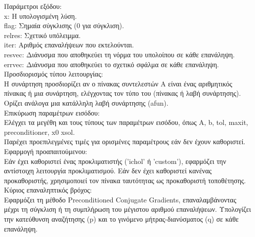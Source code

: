 \documentclass[12pt,a4paper]{article}
\begin{document}
Παράμετροι εξόδου:\\
x: Η υπολογισμένη λύση.\\
flag: Σημαία σύγκλισης (0 για σύγκλιση).\\
relres: Σχετικό υπόλειμμα.\\
iter: Αριθμός επαναλήψεων που εκτελούνται.\\
resvec: Διάνυσμα που αποθηκεύει τη νόρμα του υπολοίπου σε κάθε επανάληψη.\\
errvec: Διάνυσμα που αποθηκεύει το σχετικό σφάλμα σε κάθε επανάληψη.\\

Προσδιορισμός τύπου λειτουργίας:\\
Η συνάρτηση προσδιορίζει αν ο πίνακας συντελεστών A είναι ένας αριθμητικός πίνακας ή μια συνάρτηση, ελέγχοντας τον τύπο του (πίνακας ή λαβή συνάρτησης).
Ορίζει ανάλογα μια κατάλληλη λαβή συνάρτησης (afun).\\

Επικύρωση παραμέτρων εισόδου:\\
Ελέγχει τα μεγέθη και τους τύπους των παραμέτρων εισόδου, όπως A, b, tol, maxit, preconditioner, x0 xsol.\\
Παρέχει προεπιλεγμένες τιμές για ορισμένες παραμέτρους εάν δεν έχουν καθοριστεί.\\

Εφαρμογή προαπαιτούμενου:\\
Εάν έχει καθοριστεί ένας προκλιματιστής ('ichol' ή 'custom'), εφαρμόζει την αντίστοιχη λειτουργία προκλιματισμού.
Εάν δεν έχει καθοριστεί κανένας προκαθοριστής, χρησιμοποιεί τον πίνακα ταυτότητας ως προκαθοριστή τοποθέτησης.\\

Κύριος επαναληπτικός βρόχος:\\
Εφαρμόζει τη μέθοδο Preconditioned Conjugate Gradients, επαναλαμβάνοντας μέχρι τη σύγκλιση ή τη συμπλήρωση του μέγιστου αριθμού επαναλήψεων.
Υπολογίζει την κατεύθυνση αναζήτησης (p) και το γινόμενο μήτρας-διανύσματος (q) σε κάθε επανάληψη.\\
\end{document}
